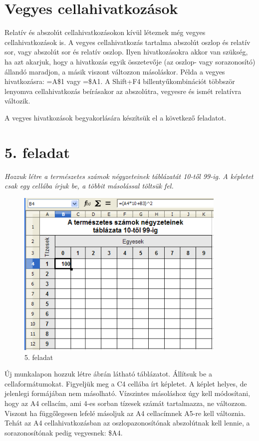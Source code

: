 \section{Vegyes cellahivatkozások}

Relatív és abszolút cellahivatkozásokon kívül léteznek
még vegyes cellahivatkozások is. A vegyes cellahivatkozás
tartalma abszolút oszlop és relatív sor, vagy abszolút sor és
relatív oszlop. Ilyen hivatkozásokra akkor van szükség, ha azt
akarjuk, hogy a hivatkozás egyik összetevője (az oszlop- vagy
sorazonosító) állandó maradjon, a másik viszont változzon
másoláskor. Példa a vegyes hivatkozásra: =A\$1 vagy =\$A1. A
Shift+F4 billentyűkombinációt többször lenyomva
cellahivatkozás beírásakor az abszolútra, vegyesre és ismét
relatívra változik.

A vegyes hivatkozások begyakorlására készítsük el a
következő feladatot.

\section{5. feladat}
{\itshape
Hozzuk létre a természetes számok négyzeteinek táblázatát
10-től 99-ig. A képletet csak egy cellába írjuk be, a
többit másolással töltsük fel.}

\begin{figure}[!h]
\begin{center}
\includegraphics[width=10.037cm]{oocalcv1-img27.png}
\caption{5. feladat}\label{5-feladat}
\end{center}
\end{figure}

Új munkalapon hozzuk létre  ábrán látható
táblázatot. Állítsuk be a cellaformátumokat. Figyeljük meg
a C4 cellába írt képletet. A képlet helyes, de jelenlegi
formájában nem másolható. Vízszintes másoláshoz úgy
kell módosítani, hogy az A4 cellacím, ami 4-es sorban tízesek
számát tartalmazza, ne változzon. Viszont ha függőlegesen
lefelé másoljuk az A4 cellacímnek A5-re kell  változnia.
Tehát az A4 cellahivatkozásban az oszlopazonosítónak
abszolútnak kell lennie, a sorazonosítónak pedig vegyesnek: \$A4.

